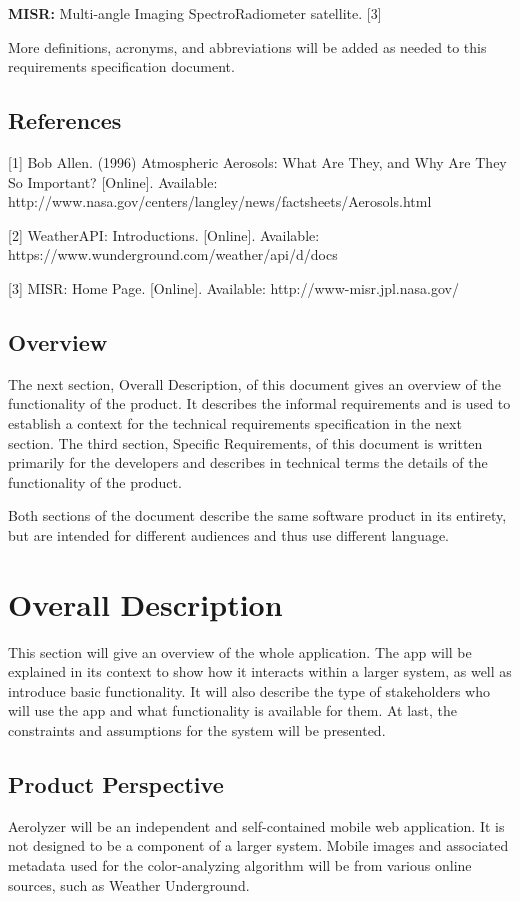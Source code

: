 \documentclass[letterpaper,10pt,draftclsnofoot,onecolumn]{IEEEtran}
\begin{document}
\begin{flushleft}
\textbf{MISR: }Multi-angle Imaging SpectroRadiometer satellite. [3]

More definitions, acronyms, and abbreviations will be added as needed to this requirements specification document.
\subsection{References}
[1] Bob Allen. (1996) Atmospheric Aerosols: What Are They, and Why Are They So Important? [Online]. Available: http://www.nasa.gov/centers/langley/news/factsheets/Aerosols.html

[2] WeatherAPI: Introductions. [Online]. Available: https://www.wunderground.com/weather/api/d/docs

[3] MISR: Home Page. [Online]. Available: http://www-misr.jpl.nasa.gov/

\subsection{Overview}
The next section, Overall Description, of this document gives an overview of the functionality of the product. 
It describes the informal requirements and is used to establish a context for the technical requirements specification in the next section.
The third section, Specific Requirements, of this document is written primarily for the developers and describes in technical terms the details of the functionality of the product.

Both sections of the document describe the same software product in its entirety, but are intended for different audiences and thus use different language.

\section{Overall Description}
This section will give an overview of the whole application. 
The app will be explained in its context to show how it interacts within a larger system, as well as introduce basic functionality. 
It will also describe the type of stakeholders who will use the app and what functionality is available for them. 
At last, the constraints and assumptions for the system will be presented.

\subsection{Product Perspective}
Aerolyzer will be an independent and self-contained mobile web application. 
It is not designed to be a component of a larger system. 
Mobile images and associated metadata used for the color-analyzing algorithm will be from various online sources, such as Weather Underground.


\end{flushleft}
\end{document}
